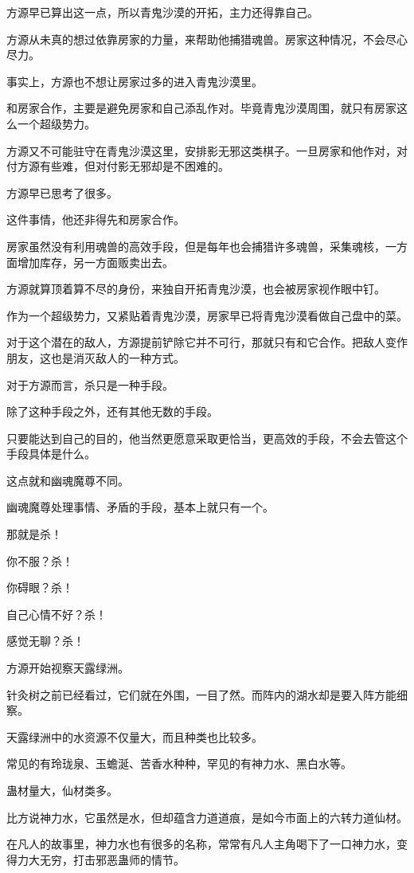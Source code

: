\begin{this_body}
方源早已算出这一点，所以青鬼沙漠的开拓，主力还得靠自己。

方源从未真的想过依靠房家的力量，来帮助他捕猎魂兽。房家这种情况，不会尽心尽力。

事实上，方源也不想让房家过多的进入青鬼沙漠里。

和房家合作，主要是避免房家和自己添乱作对。毕竟青鬼沙漠周围，就只有房家这么一个超级势力。

方源又不可能驻守在青鬼沙漠这里，安排影无邪这类棋子。一旦房家和他作对，对付方源有些难，但对付影无邪却是不困难的。

方源早已思考了很多。

这件事情，他还非得先和房家合作。

房家虽然没有利用魂兽的高效手段，但是每年也会捕猎许多魂兽，采集魂核，一方面增加库存，另一方面贩卖出去。

方源就算顶着算不尽的身份，来独自开拓青鬼沙漠，也会被房家视作眼中钉。

作为一个超级势力，又紧贴着青鬼沙漠，房家早已将青鬼沙漠看做自己盘中的菜。

对于这个潜在的敌人，方源提前铲除它并不可行，那就只有和它合作。把敌人变作朋友，这也是消灭敌人的一种方式。

对于方源而言，杀只是一种手段。

除了这种手段之外，还有其他无数的手段。

只要能达到自己的目的，他当然更愿意采取更恰当，更高效的手段，不会去管这个手段具体是什么。

这点就和幽魂魔尊不同。

幽魂魔尊处理事情、矛盾的手段，基本上就只有一个。

那就是杀！

你不服？杀！

你碍眼？杀！

自己心情不好？杀！

感觉无聊？杀！

方源开始视察天露绿洲。

针灸树之前已经看过，它们就在外围，一目了然。而阵内的湖水却是要入阵方能细察。

天露绿洲中的水资源不仅量大，而且种类也比较多。

常见的有玲珑泉、玉蟾涎、苦香水种种，罕见的有神力水、黑白水等。

蛊材量大，仙材类多。

比方说神力水，它虽然是水，但却蕴含力道道痕，是如今市面上的六转力道仙材。

在凡人的故事里，神力水也有很多的名称，常常有凡人主角喝下了一口神力水，变得力大无穷，打击邪恶蛊师的情节。


\end{this_body}
